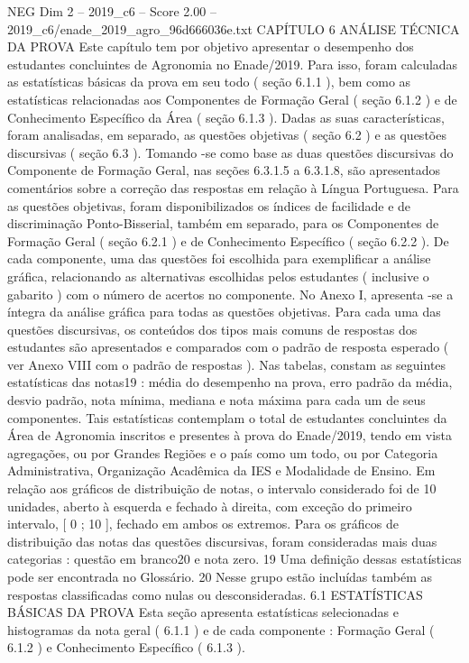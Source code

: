 \begin{textsample}{NEG Dim 2 – 2019\_c6 – Score 2.00 – 2019\_c6/enade\_2019\_agro\_96d666036e.txt}  \label{ex:f2_neg_280}
CAPÍTULO 6 ANÁLISE TÉCNICA DA PROVA Este capítulo tem por objetivo apresentar o desempenho dos estudantes concluintes de Agronomia no Enade/2019.
Para isso, foram calculadas as estatísticas básicas da prova em seu todo ( seção 6.1.1 ), bem como as estatísticas relacionadas aos Componentes de Formação Geral ( seção 6.1.2 ) e de Conhecimento Específico da Área ( seção 6.1.3 ).
Dadas as suas características, foram analisadas, em separado, as questões objetivas ( seção 6.2 ) e as questões discursivas ( seção 6.3 ).
Tomando -se como base as duas questões discursivas do Componente de Formação Geral, nas seções 6.3.1.5 a 6.3.1.8, são apresentados comentários sobre a correção das respostas em relação à Língua Portuguesa.
Para as questões objetivas, foram disponibilizados os índices de facilidade e de discriminação Ponto-Bisserial, também em separado, para os Componentes de Formação Geral ( seção 6.2.1 ) e de Conhecimento Específico ( seção 6.2.2 ).
De cada componente, uma das questões foi escolhida para exemplificar a análise gráfica, relacionando as alternativas escolhidas pelos estudantes ( inclusive o gabarito ) com o número de acertos no componente.
No Anexo I, apresenta -se a íntegra da análise gráfica para todas as questões objetivas.
Para cada uma das questões discursivas, os conteúdos dos tipos mais comuns de respostas dos estudantes são apresentados e comparados com o padrão de resposta esperado ( ver Anexo VIII com o padrão de respostas ).
Nas tabelas, constam as seguintes estatísticas das notas19 : média do desempenho na prova, erro padrão da média, desvio padrão, nota mínima, mediana e nota máxima para cada um de seus componentes.
Tais estatísticas contemplam o total de estudantes concluintes da Área de Agronomia inscritos e presentes à prova do Enade/2019, tendo em vista agregações, ou por Grandes Regiões e o país como um todo, ou por Categoria Administrativa, Organização Acadêmica da IES e Modalidade de Ensino.
Em relação aos gráficos de distribuição de notas, o intervalo considerado foi de 10 unidades, aberto à esquerda e fechado à direita, com exceção do primeiro intervalo, [ 0 ; 10 ], fechado em ambos os extremos.
Para os gráficos de distribuição das notas das questões discursivas, foram consideradas mais duas categorias : questão em branco20 e nota zero. 19 Uma definição dessas estatísticas pode ser encontrada no Glossário. 20 Nesse grupo estão incluídas também as respostas classificadas como nulas ou desconsideradas. 6.1 ESTATÍSTICAS BÁSICAS DA PROVA Esta seção apresenta estatísticas selecionadas e histogramas da nota geral ( 6.1.1 ) e de cada componente : Formação Geral ( 6.1.2 ) e Conhecimento Específico ( 6.1.3 ).

\end{textsample}
